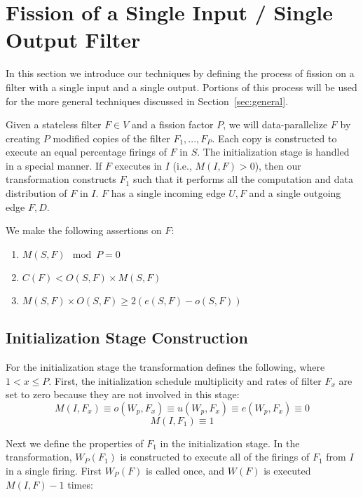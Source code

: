 \section{Fission of a Single Input / Single Output Filter}
\label{sec:single}

In this section we introduce our techniques by defining the
process of fission on a filter with a single input and a single
output. Portions of this process will be used for the more general
techniques discussed in Section~\ref{sec:general}. 

Given a stateless filter $F \in V$ and a fission factor $P$, we will
data-parallelize $F$ by creating $P$ modified copies of the filter
$F_1, ..., F_P$.  Each copy is constructed to execute an equal
percentage firings of $F$ in $S$.  The initialization stage is handled
in a special manner.  If $F$ executes in $I$ (i.e., $M(I,F) > 0$),
then our transformation constructs $F_1$ such that it performs all the
computation and data distribution of $F$ in $I$. $F$ has a single
incoming edge ${U,F}$ and a single outgoing edge ${F, D}$.


We make the following assertions on $F$:

\begin{enumerate}

\item $M(S,F) \mod  P = 0$

\item $C(F) < O(S,F) \times M(S,F)$

\item $M(S,F) \times O(S,F) \ge 2(e(S,F) - o(S,F))$

\end{enumerate}


\subsection{Initialization Stage Construction}

For the initialization stage the transformation defines the following,
where $1 < x \le P$. First, the initialization
schedule multiplicity and rates of filter $F_x$ are set to zero
because they are not involved in this stage:
$$ M(I,F_x) \equiv o(W_p,F_x) \equiv u(W_p,F_x) \equiv e(W_p,F_x)
\equiv 0 $$
$$ M(I,F_1) \equiv 1 $$

Next we define the properties of $F_1$ in the initialization stage. In
the transformation, $W_P(F_1)$ is constructed to execute all of the
firings of $F_1$ from $I$ in a single firing.  First $W_P(F)$ is
called once, and $W(F)$ is executed $M(I,F) - 1$ times:

